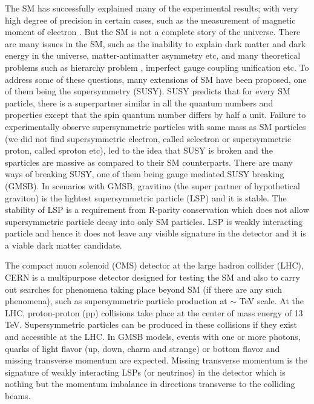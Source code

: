 The SM has successfully explained many of the experimental results; with very high degree of precision in certain cases, such as 
the measurement of magnetic moment of electron \cite{PhysRevLett.97.030801}. But the SM is not 
a complete story of the universe. %
There are many issues in the SM, such as the inability to explain dark matter \cite{Zwicky:1933gu,Clowe:2006eq} and dark energy 
\cite{Riess:1998cb} in the universe, 
matter-antimatter asymmetry \cite{doi:10.1146/annurev.aa.14.090176.002011,Canetti:2012zc} etc, and many theoretical problems such as 
hierarchy problem \cite{tHooft:1979rat}, imperfect gauge coupling unification etc. To address some of these questions, many 
extensions of SM have been proposed, one of them being the supersymmetry (SUSY). SUSY predicts that for every SM particle, there is a 
superpartner similar in all the quantum numbers and properties except that the spin quantum number differs by half a unit. Failure to 
experimentally observe supersymmetric particles with same mass as SM particles (we did not find supersymmetric electron, 
called selectron or supersymmetric proton, called sproton etc), led to the idea that SUSY is broken and the sparticles are massive as compared to their SM 
counterparts. There are many ways of breaking SUSY, one of them being gauge mediated SUSY breaking 
(GMSB). In scenarios with GMSB, gravitino (the super partner of hypothetical graviton) is the lightest supersymmetric particle (LSP) and it is 
stable. The stability of LSP is a requirement from R-parity conservation which does not allow supersymmetric particle decay into only SM 
particles. LSP is weakly interacting particle and hence it does not leave any visible signature in the detector and it is a viable dark 
matter candidate.

The compact muon solenoid (CMS) detector at the large hadron collider (LHC), CERN is a multipurpose detector designed for
testing the SM and also to carry out searches for phenomena taking place beyond SM (if there are any such phenomena),
such as supersymmetric particle production at $\sim$ TeV scale. At the LHC, proton-proton (pp) collisions 
take place at the center of mass energy of 13 TeV. Supersymmetric particles can be produced in these collisions if they exist and 
accessible at the LHC. In GMSB models, events with one or more photons, quarks of light flavor (up, down, charm and strange) or bottom 
flavor and missing transverse momentum are expected. Missing transverse momentum is the signature of weakly interacting LSPs (or 
neutrinos) in the detector which is nothing but the momentum imbalance in directions transverse to the colliding beams.

